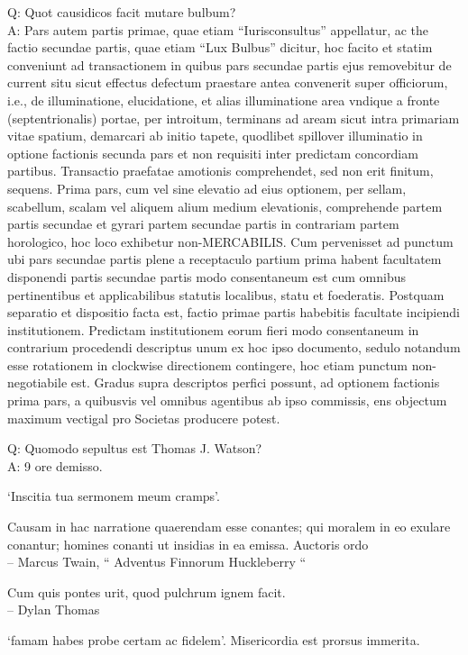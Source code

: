 \documentclass[titlepage,12pt]{memoir}
\begin{document}
Q: Quot causidicos facit mutare bulbum?\\
A: Pars autem partis primae, quae etiam “Iurisconsultus” appellatur, ac the
factio secundae partis, quae etiam “Lux Bulbus” dicitur, hoc facito et statim
conveniunt ad transactionem in quibus pars secundae partis ejus removebitur
de current situ sicut effectus defectum praestare antea convenerit
super officiorum, i.e., de illuminatione, elucidatione, et alias illuminatione
area vndique a fronte (septentrionalis) portae, per introitum, terminans
ad aream sicut intra primariam vitae spatium, demarcari ab initio
tapete, quodlibet spillover illuminatio in optione factionis
secunda pars et non requisiti inter predictam concordiam
partibus.
Transactio praefatae amotionis comprehendet, sed non erit
finitum, sequens. Prima pars, cum vel sine
elevatio ad eius optionem, per sellam, scabellum, scalam vel aliquem alium
medium elevationis, comprehende partem partis secundae et gyrari partem
secundae partis in contrariam partem horologico, hoc loco exhibetur
non-MERCABILIS. Cum pervenisset ad punctum ubi pars secundae partis
plene a receptaculo partium prima
habent facultatem disponendi partis secundae partis modo
consentaneum est cum omnibus pertinentibus et applicabilibus statutis localibus, statu et foederatis.
Postquam separatio et dispositio facta est, factio primae partis
habebitis facultate incipiendi institutionem. Predictam institutionem eorum
fieri modo consentaneum in contrarium procedendi descriptus
unum ex hoc ipso documento, sedulo notandum esse rotationem
in clockwise directionem contingere, hoc etiam punctum non- negotiabile est.
Gradus supra descriptos perfici possunt, ad optionem factionis
prima pars, a quibusvis vel omnibus agentibus ab ipso commissis, ens objectum
maximum vectigal pro Societas producere potest.

Q: Quomodo sepultus est Thomas J. Watson?\\
A: 9 ore demisso.

‘Inscitia tua sermonem meum cramps’.

 Causam in hac narratione quaerendam esse conantes;
qui moralem in eo exulare conantur; homines conanti
ut insidias in ea emissa. Auctoris ordo
\\-- Marcus Twain, “ Adventus Finnorum Huckleberry “

Cum quis pontes urit, quod pulchrum ignem facit.
\\-- Dylan Thomas

‘famam habes probe certam ac fidelem’.
Misericordia est prorsus immerita.
\end{document}

